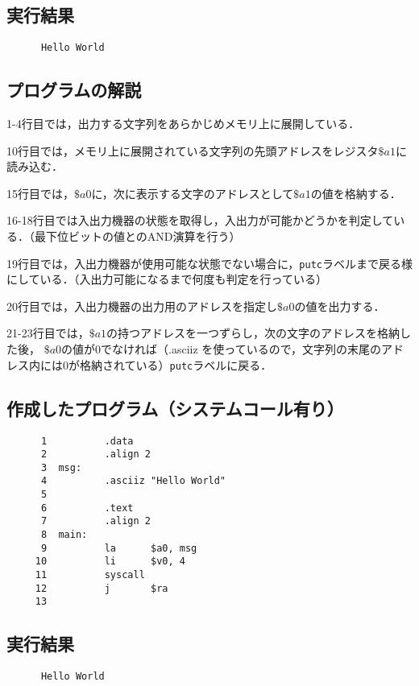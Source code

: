 \documentclass[a4j,11pt]{jarticle}
\begin{document}
\subsection{実行結果}

\begin{verbatim}
      Hello World      
\end{verbatim}

\subsection{プログラムの解説}
1-4行目では，出力する文字列をあらかじめメモリ上に展開している．

10行目では，メモリ上に展開されている文字列の先頭アドレスをレジスタ$\$a1$に読み込む．

15行目では，$\$a0$に，次に表示する文字のアドレスとして$\$a1$の値を格納する．

16-18行目では入出力機器の状態を取得し，入出力が可能かどうかを判定している．（最下位ビットの値とのAND演算を行う）

19行目では，入出力機器が使用可能な状態でない場合に，{\tt putc}ラベルまで戻る様にしている．（入出力可能になるまで何度も判定を行っている）

20行目では，入出力機器の出力用のアドレスを指定し$\$a0$の値を出力する．

21-23行目では，$\$a1$の持つアドレスを一つずらし，次の文字のアドレスを格納した後，
$\$a0$の値が$0$でなければ（.asciiz を使っているので，文字列の末尾のアドレス内には$0$が格納されている）{\tt putc}ラベルに戻る．

\subsection{作成したプログラム（システムコール有り）}

\begin{verbatim}
      1          .data
      2          .align 2
      3  msg:
      4          .asciiz "Hello World"
      5
      6          .text
      7          .align 2
      8  main:
      9          la      $a0, msg
     10          li      $v0, 4
     11          syscall
     12          j       $ra
     13          
\end{verbatim}
\subsection{実行結果}

\begin{verbatim}
      Hello World      
\end{verbatim}
\end{document}
